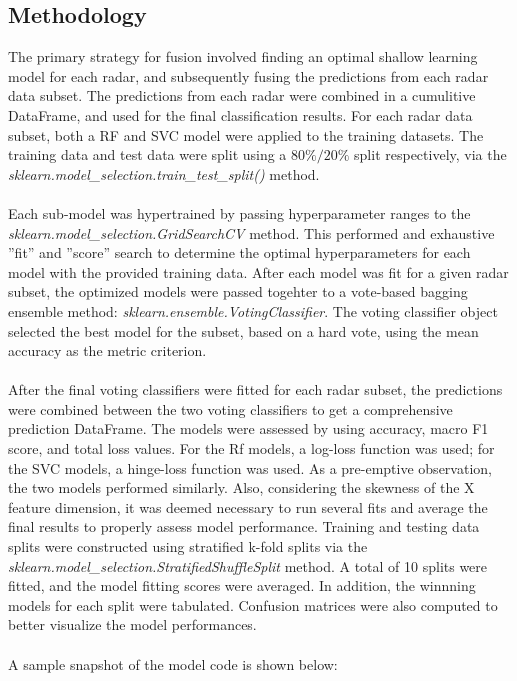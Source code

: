 \documentclass[./report_entry.tex]{subfiles}
\begin{document}
        \subsection*{Methodology}
        \noindent The primary strategy for fusion involved finding an optimal shallow learning model for each radar, and
        subsequently fusing the predictions from each radar data subset.  The predictions from each radar were combined in a 
        cumulitive DataFrame, and used for the final classification results.  For each radar data subset,
        both a RF and SVC model were applied to the training datasets.  The training data and test data were split using a
        $80\%/20\%$ split respectively, via the \textit{sklearn.model\_selection.train\_test\_split()} method.
        \\ \\
        \noindent Each sub-model was hypertrained by passing hyperparameter ranges to the 
        \textit{sklearn.model\_selection.GridSearchCV} method.  This performed and exhaustive ''fit'' and ''score'' search
        to determine the optimal hyperparameters for each model with the provided training data.  After each model was fit for a given
        radar subset, the optimized models were passed togehter to a vote-based bagging ensemble method: \textit{sklearn.ensemble.VotingClassifier}.
        The voting classifier object selected the best model for the subset, based on a hard vote, using the mean
        accuracy as the metric criterion.
        \\ \\
        \noindent After the final voting classifiers were fitted for each radar subset, the predictions were combined
        between the two voting classifiers to get a comprehensive prediction DataFrame. The models were assessed by using 
        accuracy, macro F1 score, and total loss values.  For the Rf models, a log-loss function was used; for the SVC models, a
        hinge-loss function was used. As a pre-emptive observation, the two models performed similarly.  Also, considering the skewness of the X
        feature dimension, it was deemed necessary to run several fits and average the final results to properly assess model performance.  Training and testing
        data splits were constructed using stratified k-fold splits via the \textit{sklearn.model\_selection.StratifiedShuffleSplit}
        method.  A total of 10 splits were fitted, and the model fitting scores were averaged.  In addition, the winnning models for
        each split were tabulated.  Confusion matrices were also computed to better visualize the model performances.
        \\ \\
        \noindent A sample snapshot of the model code is shown below:
\end{document}
